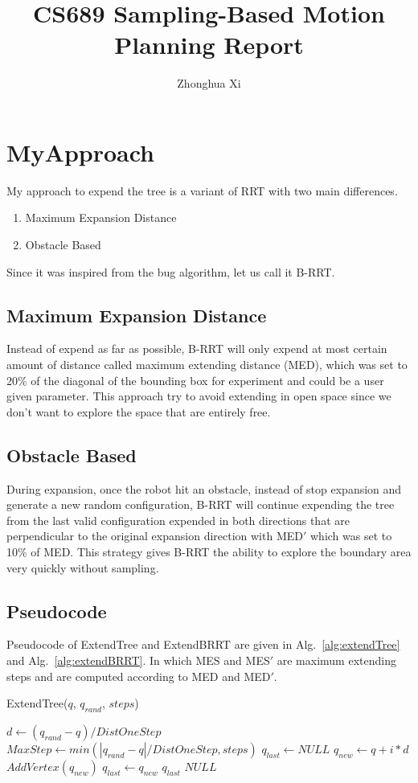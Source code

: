 \documentclass[11pt, oneside]{article}   	%
\title{CS689 Sampling-Based Motion Planning Report}
\author{Zhonghua Xi}
\begin{document}
\maketitle

\section{MyApproach}
My approach to expend the tree is a variant of RRT with two main differences.
\begin{enumerate}
  \item Maximum Expansion Distance 
  \item Obstacle Based
\end{enumerate}
Since it was inspired from the bug algorithm, let us call it B-RRT.

\subsection{Maximum Expansion Distance}
Instead of expend as far as possible, 
B-RRT will only expend at most certain amount of distance called maximum extending distance (MED), which was set to 20\% of the diagonal of the bounding box for experiment and could be a user given parameter.
This approach try to avoid extending in open space since we don't want to explore the space that are entirely free.

\subsection{Obstacle Based}
During expansion, once the robot hit an obstacle, 
instead of stop expansion and generate a new random configuration, 
B-RRT will continue expending the tree from the last valid configuration expended in both directions that are perpendicular to the original expansion direction with MED$'$ which was set to 10\% of MED.
This strategy gives B-RRT the ability to explore the boundary area very quickly without sampling. 

\subsection{Pseudocode}
Pseudocode of ExtendTree and ExtendBRRT are given in Alg.~\ref{alg:extendTree} and Alg.~\ref{alg:extendBRRT}.
In which MES and MES$'$ are maximum extending steps and are computed according to MED and MED$'$.

\begin{algorithm}                      	
\caption{ExtendTree($q$, $q_{rand}$, $steps$)}
\label{alg:extendTree}                     	
\begin{algorithmic}
\State $d \gets (q_{rand} - q) / DistOneStep$
\State $MaxStep \gets min(|q_{rand} - q| / DistOneStep, steps)$
\State $q_{last} \gets NULL$
	\State $q_{new} \gets q + i*d$
    	\State $AddVertex(q_{new})$
		\State $q_{last} \gets q_{new}$ 
	\Else
        	\State	\Return $q_{last}$
    	\EndIf
	\EndIf
\EndFor
\State \Return $NULL$
\end{algorithmic}
\end{algorithm}
\end{document}
